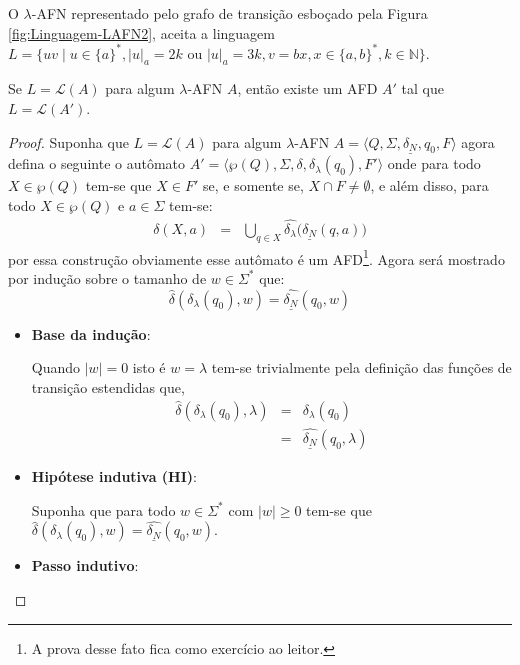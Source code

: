 \begin{exem}\label{exe:LinguagemLAFN2}
	O $\lambda$-AFN representado pelo grafo de transição esboçado pela Figura \ref{fig:Linguagem-LAFN2}, aceita a linguagem $L = \{uv \mid u \in \{a\}^*, |u|_a = 2k\text{ ou } |u|_a = 3k, v=bx, x \in \{a,b\}^*, k \in \mathbb{N}\}$.
\end{exem}

\begin{theorem}\label{teo:LAFN-AFD}
	Se $L = \mathcal{L}(A)$ para algum $\lambda$-AFN $A$, então existe um  AFD $A'$ tal que $L = \mathcal{L}(A')$.
\end{theorem}

\begin{proof}
	Suponha que $L = \mathcal{L}(A)$ para algum $\lambda$-AFN $A =  \langle Q, \Sigma, \underline{\delta_N}, q_0, F \rangle$ agora defina o seguinte o autômato $A' = \langle \wp(Q), \Sigma, \delta, \delta_\lambda(q_0), F' \rangle$ onde para todo $X \in \wp(Q)$ tem-se que $X \in F'$ se, e somente se, $X \cap F \neq \emptyset$, e além disso, para todo $X \in \wp(Q)$ e $a \in \Sigma$ tem-se:
	\begin{eqnarray}\label{eq:LAFN-AFD}
		\delta(X, a) & = & \bigcup_{q \in X} \widehat{\delta_\lambda}\Big(\underline{\delta_N}(q, a)\Big)
	\end{eqnarray}
	por essa construção obviamente esse autômato é um AFD\footnote{A prova desse fato fica como exercício ao leitor.}. Agora será mostrado por indução sobre o tamanho de $w \in \Sigma^*$ que:
	$$\widehat{\delta}(\delta_\lambda(q_0), w) = \widehat{\underline{\delta_N}}(q_0, w)$$
	\begin{itemize}
		\item \textbf{Base da indução}:
		
		Quando $|w| = 0$ isto é $w = \lambda$ tem-se trivialmente pela definição das funções de transição estendidas que, 
		\begin{eqnarray*}
			\widehat{\delta}(\delta_\lambda(q_0), \lambda) & = & \delta_\lambda(q_0)\\
			& = & \widehat{\underline{\delta_N}}(q_0, \lambda)
		\end{eqnarray*}
		
		\item \textbf{Hipótese indutiva (HI)}:
		
		Suponha que para todo $w \in \Sigma^*$ com $|w| \geq 0$ tem-se que $\widehat{\delta}(\delta_\lambda(q_0), w) = \widehat{\underline{\delta_N}}(q_0, w)$.
		\item \textbf{Passo indutivo}:
		

\end{itemize}
\end{proof}
